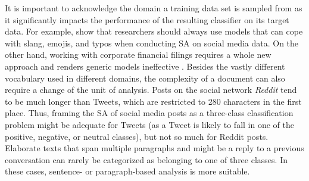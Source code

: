  It is important to acknowledge the domain a training data set is sampled from as it significantly impacts the performance of the resulting classifier on its target data. For example,  show that researchers should always use models that can cope with slang, emojis, and typos when conducting SA on social media data. On the other hand, working with corporate financial filings requires a whole new approach and renders generic models ineffective . Besides the vastly different vocabulary used in different domains, the complexity of a document can also require a change of the unit of analysis. Posts on the social network \emph{Reddit} tend to be much longer than Tweets, which are restricted to 280 characters in the first place. Thus, framing the SA of social media posts as a three-class classification problem might be adequate for Tweets (as a Tweet is likely to fall in one of the positive, negative, or neutral classes), but not so much for Reddit posts. Elaborate texts that span multiple paragraphs and might be a reply to a previous conversation can rarely be categorized as belonging to one of three classes. In these cases, sentence- or paragraph-based analysis is more suitable.
 




